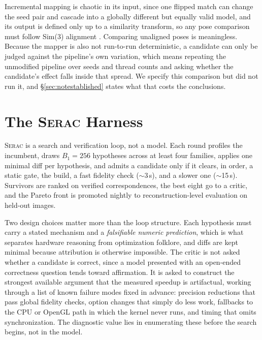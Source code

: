\documentclass[conference]{IEEEtran}
\newcommand{\sys}{\textnormal{\textsc{Serac}}\xspace}
\begin{document}
Incremental mapping is chaotic in its input, since one flipped match can change
the seed pair and cascade into a globally different but equally valid model, and
its output is defined only up to a similarity transform, so any pose comparison
must follow Sim(3) alignment \cite{umeyama1991least}. Comparing unaligned poses
is meaningless. Because the mapper is also not run-to-run deterministic, a
candidate can only be judged against the pipeline's own variation, which means
repeating the unmodified pipeline over seeds and thread counts and asking whether
the candidate's effect falls inside that spread. We specify this comparison but
did not run it, and \S\ref{sec:notestablished} states what that costs the
conclusions.


\section{The \sys{} Harness}
\label{sec:harness}

\sys{} is a search and verification loop, not a model. Each round profiles the
incumbent, draws $B_1 = 256$ hypotheses across at least four families, applies
one minimal diff per hypothesis, and admits a candidate only if it clears, in
order, a static gate, the build, a fast fidelity check ($\sim$3\,s), and a
slower one ($\sim$15\,s). Survivors are ranked on verified correspondences, the
best eight go to a critic, and the Pareto front is promoted nightly to
reconstruction-level evaluation on held-out images.

Two design choices matter more than the loop structure. Each hypothesis must
carry a stated mechanism and a \emph{falsifiable numeric prediction}, which is
what separates hardware reasoning from optimization folklore, and diffs are kept
minimal because attribution is otherwise impossible. The critic is not asked
whether a candidate is correct, since a model presented with an open-ended
correctness question tends toward affirmation. It is asked to construct the
strongest available argument that the measured speedup is artifactual, working
through a list of known failure modes fixed in advance: precision reductions
that pass global fidelity checks, option changes that simply do less work,
fallbacks to the CPU or OpenGL path in which the kernel never runs, and timing
that omits synchronization. The diagnostic value lies in enumerating these
before the search begins, not in the model.
\end{document}
